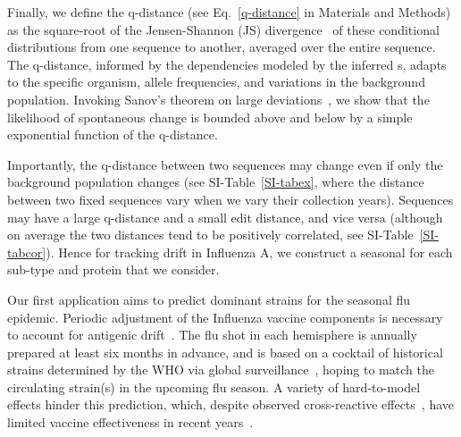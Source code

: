 \documentclass[onecolumn, compsoc,10pt]{IEEEtran}
\begin{document}
Finally, we define the q-distance (see Eq.~\eqref{q-distance} in Materials and Methods) as the square-root of the Jensen-Shannon (JS) divergence~\cite{cover} of these conditional distributions from one sequence to another, averaged over the entire sequence. The q-distance, informed by the dependencies modeled by the inferred {\qnet}s, adapts to the specific organism, allele frequencies, and variations in the background population. Invoking Sanov's theorem on large deviations~\cite{cover}, we show  that the  likelihood of spontaneous change is bounded above and below by a simple exponential function of the  q-distance. 


Importantly, the q-distance  between two sequences may change even if only the background population changes (see SI-Table~\ref{SI-tabex}, where  the distance between two  fixed sequences vary when we vary their collection years). Sequences may have a large q-distance and a small edit distance, and vice versa (although on average the two distances tend to be positively correlated, see SI-Table~\ref{SI-tabcor}).  Hence for tracking drift in Influenza A, we construct a seasonal \qnet for each sub-type and protein that we consider.

Our first application aims to predict dominant strains for the seasonal flu epidemic. Periodic adjustment of the Influenza vaccine components is necessary to account for antigenic drift~\cite{boni2008vaccination,dos2016influenza}. The flu shot in each hemisphere is annually prepared at least six months in advance, and is based on a cocktail of historical strains determined by the WHO via global surveillance~\cite{agor2018models}, hoping to match the circulating strain(s) in the upcoming flu season. A variety of hard-to-model effects hinder this prediction, which, despite observed cross-reactive effects~\cite{tricco2013comparing}, have limited vaccine effectiveness in recent years~\cite{cdceff}.
\end{document}
